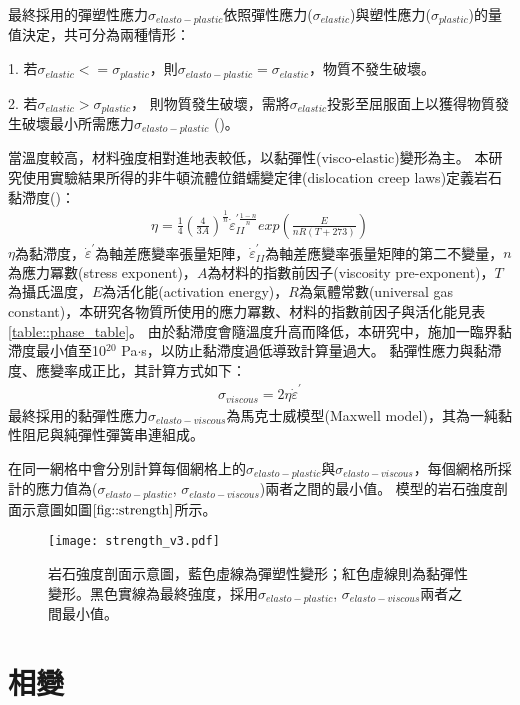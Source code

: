 最終採用的彈塑性應力$\sigma_{elasto-plastic}$依照彈性應力($\sigma_{elastic}$)與塑性應力($\sigma_{plastic}$)的量值決定，共可分為兩種情形：

1. 若$\sigma_{elastic} <= \sigma_{plastic}$，則$ \sigma_{elasto-plastic} = \sigma_{elastic}$，物質不發生破壞。

2. 若$\sigma_{elastic} > \sigma_{plastic}$， 則物質發生破壞，需將$\sigma_{elastic}$投影至屈服面上以獲得物質發生破壞最小所需應力$\sigma_{elasto-plastic}$ (\citealp{simo2006computational})。

當溫度較高，材料強度相對進地表較低，以黏彈性(visco-elastic)變形為主。
本研究使用實驗結果所得的非牛頓流體位錯蠕變定律(dislocation creep laws)定義岩石黏滯度(\citealp{Chen1990})：
\begin{align}
   \eta=\frac{1}{4}(\frac{4}{3A})^{\frac{1}{n}} \dot\varepsilon_{II}^{' \frac{1-n}{n}} exp(\frac{E}{nR(T+273)})
   \label{eqn:viscousity}
\end{align}
$\eta$為黏滯度，$\dot\varepsilon^{'}$為軸差應變率張量矩陣，$\dot\varepsilon_{II}^{'}$為軸差應變率張量矩陣的第二不變量，$n$為應力冪數(stress exponent)，$A$為材料的指數前因子(viscosity pre-exponent)，$T$為攝氏溫度，$E$為活化能(activation energy)，$R$為氣體常數(universal gas constant)，本研究各物質所使用的應力冪數、材料的指數前因子與活化能見表\ref{table::phase_table}。
由於黏滯度會隨溫度升高而降低，本研究中，施加一臨界黏滯度最小值至10$^{20}$ Pa$\cdot$s，以防止黏滯度過低導致計算量過大。
黏彈性應力與黏滯度、應變率成正比，其計算方式如下：	
\begin{align}
    \sigma_{viscous} = 2\eta\dot\varepsilon^{'} \label{eqn:viscous tensor}
\end{align}
最終採用的黏彈性應力$\sigma_{elasto-viscous}$為馬克士威模型(Maxwell model)，其為一純黏性阻尼與純彈性彈簧串連組成。

在同一網格中會分別計算每個網格上的$\sigma_{elasto-plastic}$與$\sigma_{elasto-viscous}$，每個網格所採計的應力值為($\sigma_{elasto-plastic}$, $\sigma_{elasto-viscous}$)兩者之間的最小值。
模型的岩石強度剖面示意圖如圖$\ref{fig::strength}$所示。
\begin{figure*}[ht!]
    \centering
    \texttt{[image: strength\_v3.pdf]}
    \caption[岩石強度剖面示意圖]{岩石強度剖面示意圖，藍色虛線為彈塑性變形；紅色虛線則為黏彈性變形。黑色實線為最終強度，採用$\sigma_{elasto-plastic}$, $\sigma_{elasto-viscous}$兩者之間最小值。}
    \label{fig::strength}
\end{figure*}

\section{相變}\label{相變}

